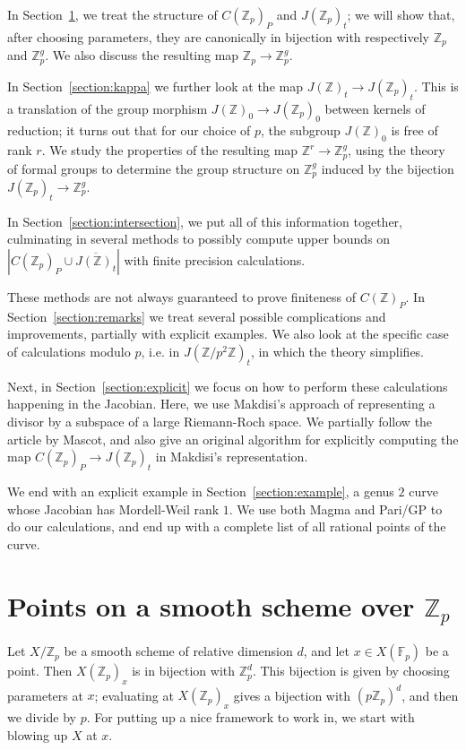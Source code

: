 \documentclass[12pt]{article}
\newcommand{\Z}{\mathbb{Z}}
\newcommand{\F}{\mathbb{F}}
\theoremstyle{plain}
\theoremstyle{definition}
\theoremstyle{remark}
\begin{document}
In Section~\ref{section:smoothzppoints}, we treat the structure of $C(\Z_p)_P$ and $J(\Z_p)_t$; we will show that, after choosing parameters, they are canonically in bijection with respectively $\Z_p$ and $\Z_p^g$. We also discuss the resulting map $\Z_p \to \Z_p^g$.

In Section~\ref{section:kappa} we further look at the map $J(\Z)_t \to J(\Z_p)_t$. This is a translation of the group morphism $J(\Z)_0 \to J(\Z_p)_0$ between kernels of reduction; it turns out that for our choice of $p$, the subgroup $J(\Z)_0$ is free of rank $r$. We study the properties of the resulting map $\Z^r \to \Z_p^g$, using the theory of formal groups to determine the group structure on $\Z_p^g$ induced by the bijection $J(\Z_p)_t \to \Z_p^g$.

In Section~\ref{section:intersection}, we put all of this information together, culminating in several methods to possibly compute upper bounds on $\left|C(\Z_p)_P \cup \overline{J(\Z)_t}\right|$ with finite precision calculations.

These methods are not always guaranteed to prove finiteness of $C(\Z)_P$. In Section~\ref{section:remarks} we treat several possible complications and improvements, partially with explicit examples. We also look at the specific case of calculations modulo $p$, i.e. in $J(\Z/p^2\Z)_t$, in which the theory simplifies. 

Next, in Section~\ref{section:explicit} we focus on how to perform these calculations happening in the Jacobian. Here, we use Makdisi's approach of representing a divisor by a subspace of a large Riemann-Roch space. We partially follow the article \citep{mascot2018} by Mascot, and also give an original algorithm for explicitly computing the map $C(\Z_p)_P \to J(\Z_p)_t$ in Makdisi's representation.

We end with an explicit example in Section~\ref{section:example}, a genus $2$ curve whose Jacobian has Mordell-Weil rank $1$. We use both Magma and Pari/GP to do our calculations, and end up with a complete list of all rational points of the curve.

\newpage
\section{Points on a smooth scheme over \texorpdfstring{$\Z_p$}{Z\_p}}
\label{section:smoothzppoints}
Let $X/\Z_p$ be a smooth scheme of relative dimension $d$, and let $x \in X(\F_p)$ be a point. Then $X(\Z_p)_x$ is in bijection with $\Z_p^d$. This bijection is given by choosing parameters at $x$; evaluating at $X(\Z_p)_x$ gives a bijection with $(p\Z_p)^d$, and then we divide by $p$. For putting up a nice framework to work in, we start with blowing up $X$ at $x$.
\end{document}
